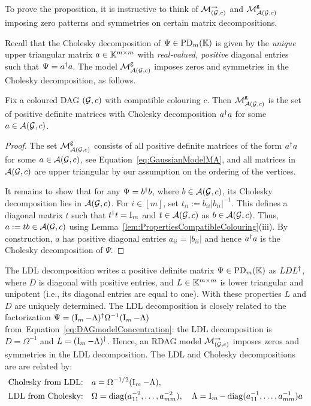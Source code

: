 To prove the proposition, it is instructive to think of $\mathcal{M}_{(\mathcal{G}, c)}^{\to}$ and $\mathcal{M}^{\mathtt{g}}_{\mathcal{A}(\mathcal{G}, c)}$ imposing zero patterns and symmetries on certain matrix decompositions.

Recall that the Cholesky decomposition of $\Psi \in \operatorname{PD}_m(\mathbb K)$ is given by the \emph{unique} upper triangular matrix $a \in \mathbb K^{m \times m}$ with \emph{real-valued,  positive} diagonal entries such that $\Psi = a^{\dagger} a$. The model $\mathcal{M}^{\mathtt{g}}_{\mathcal{A}(\mathcal{G}, c)}$ imposes zeros and symmetries in the Cholesky decomposition, as follows.

\begin{lemma}
	\label{lem:CholeskyMgAGc} %
	Fix a coloured DAG $(\mathcal{G}, c)$ with compatible colouring $c$. Then $\mathcal{M}^{\mathtt{g}}_{\mathcal{A}(\mathcal{G}, c)}$ is the set of positive definite matrices with Cholesky decomposition $a^{\dagger} a$ for some $a \in \mathcal{A}(\mathcal{G}, c)$.
\end{lemma}

\begin{proof} 
	The set $\mathcal{M}^{\mathtt{g}}_{\mathcal{A}(\mathcal{G}, c)}$ consists of all positive definite matrices of the form
	$a^{\dagger} a$ for some $a \in \mathcal{A}(\mathcal{G}, c)$, see Equation~\eqref{eq:GaussianModelMA}, and all matrices in $\mathcal{A}(\mathcal{G}, c)$ are upper triangular by our assumption on the ordering of the vertices.
	
	It remains to show that for any $\Psi = b^{\dagger} b$, where $b \in \mathcal{A}(\mathcal{G}, c)$, its Cholesky decomposition lies in $\mathcal{A}(\mathcal{G}, c)$.	
	For $i \in [m]$, set $t_{ii} := \overline{b_{ii}} |b_{ii}|^{-1}$. This defines a diagonal matrix $t$ such that $t^{\dagger} t = \operatorname{I}_m$ and $t \in \mathcal{A}(\mathcal{G}, c)$ as $b \in \mathcal{A}(\mathcal{G}, c)$.
	Thus, $a := tb \in \mathcal{A}(\mathcal{G}, c)$ using Lemma~\ref{lem:PropertiesCompatibleColouring}(iii). By construction, $a$ has positive diagonal entries $a_{ii} = |b_{ii}|$ and hence $a^{\dagger} a$ is the Cholesky decomposition of $\Psi$.
\end{proof}

The LDL decomposition writes a positive definite matrix $\Psi \in \operatorname{PD}_m(\mathbb K)$ as $LDL^{\dagger}$, where $D$ is diagonal with positive entries, and $L \in \mathbb K^{m \times m}$ is lower triangular and unipotent (i.e., its diagonal entries are equal to one). With these properties $L$ and $D$ are uniquely determined.
The LDL decomposition is closely related to the factorization $\Psi = (\operatorname{I}_m - \Lambda)^{\dagger} \Omega^{-1} (\operatorname{I}_m - \Lambda)$ from~Equation~\eqref{eq:DAGmodelConcentration}: the LDL decomposition is $D = \Omega^{-1}$ and $L = (\operatorname{I}_m - \Lambda)^{\dagger}$.
Hence, an RDAG model $\mathcal{M}_{(\mathcal{G}, c)}^{\to}$ imposes zeros and symmetries in the LDL decomposition.
The LDL and Cholesky decompositions are are related by: %
	\begin{align*}
		\text{Cholesky from LDL:} \quad & a = \Omega^{-1/2} (\operatorname{I}_m - \Lambda), \\ 
		\text{LDL from Cholesky:} \quad & \Omega = \operatorname{diag}( a_{11}^{-2},\ldots, a_{mm}^{-2}), \quad 
		\Lambda = \operatorname{I}_m - \operatorname{diag}(a_{11}^{-1}, \ldots, a_{mm}^{-1}) a
	\end{align*}

